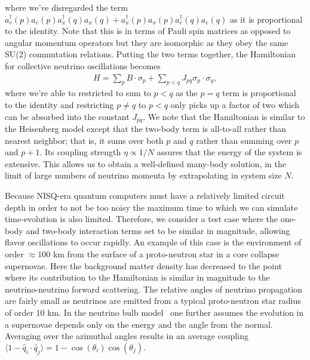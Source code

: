 \documentclass[10pt]{article}
\begin{document}
where we've disregarded the term $a_e^\dagger(p)a_e(p)a_x^\dagger(q)a_x(q)+a_x^\dagger(p)a_x(p)a_e^\dagger(q)a_e(q)$ as it is proportional to the identity. Note that this is in terms of Pauli spin matrices as opposed to angular momentum operators but they are isomorphic as they obey the same SU(2) commutation relations. Putting the two terms together, the Hamiltonian for collective neutrino oscillations becomes
\begin{align}
\label{cno_hamiltonian}
H=\sum_pB\cdot\sigma_p+\sum_{p<q}J_{pq}\sigma_p\cdot\sigma_q
,\end{align}
where we're able to restricted to sum to $p<q$ as the $p=q$ term is proportional to the identity and restricting $p\neq q$ to $p<q$ only picks up a factor of two which can be absorbed into the constant $J_{pq}$. We note that the Hamiltonian is similar to the Heisenberg model except that the two-body term is all-to-all rather than nearest neighbor; that is, it sums over both $p$ and $q$ rather than summing over $p$ and $p+1$. Its coupling strength $\eta\propto1/N$ assures that the energy of the system is extensive. This allows us to obtain a well-defined many-body solution, in the limit of large
numbers of neutrino momenta by extrapolating in system size $N$.

Because NISQ-era quantum computers must have a relatively limited circuit depth in order to not be too noisy 
the maximum time to which we can simulate time-evolution is also limited. Therefore, we consider a test case where the one-body and two-body interaction terms set to be similar in magnitude, allowing flavor oscillations to occur rapidly. An example of this case is the environment of order $\approx100$ km from the surface of a proto-neutron star in a core collapse supernovae. Here the background matter density has decreased to the point where its contribution to the Hamiltonian is similar in magnitude to the neutrino-neutrino forward scattering. The relative angles of neutrino propagation are fairly small as neutrinos are emitted from a typical proto-neutron star radius of order 10 km. In the neutrino bulb model~\cite{Duan:2006} one further assumes the evolution in a supernovae depends only on the energy and the angle from the normal. Averaging over the azimuthal angles results in an average
coupling $\langle 1-{\hat {q}}_i \cdot {\hat {q}}_j \rangle = 1 - \cos(\theta_i) \cos(\theta_j).$
\end{document}
